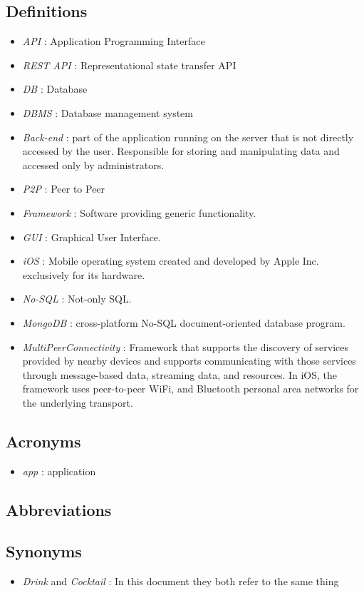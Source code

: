 \documentclass[paper=a4, fontsize=12pt]{scrartcl}
\numberwithin{equation}{section}		%
\numberwithin{figure}{section}			%
\numberwithin{table}{section}				%
\begin{document}
\subsection{Definitions}
\begin{itemize}
    \item \textit{API} : Application Programming Interface
    \item \textit{REST API} : Representational state transfer API
    \item \textit{DB} : Database
    \item \textit{DBMS} : Database management system
    \item \textit{Back-end} : part of the application running on the server that is not directly accessed by the user. Responsible for storing and manipulating data and accessed only by administrators. 
    \item \textit{P2P} : Peer to Peer
	\item \textit{Framework} : Software providing generic functionality.
	\item \textit{GUI} : Graphical User Interface.
	\item \textit{iOS} : Mobile operating system created and developed by Apple Inc. exclusively for its hardware.
    \item \textit{No-SQL} : Not-only SQL.
    \item \textit{MongoDB} : cross-platform No-SQL document-oriented database program.
    \item \textit{MultiPeerConnectivity} : Framework that supports the discovery of services provided by nearby devices and supports communicating with those services through message-based data, streaming data, and resources. In iOS, the framework uses peer-to-peer WiFi, and Bluetooth personal area networks for the underlying transport.
    

\end{itemize}

\subsection{Acronyms}
\begin{itemize}
    \item \textit{app} : application
\end{itemize}
\subsection{Abbreviations}
\subsection{Synonyms}
\begin{itemize}
    \item \textit{Drink} and \textit{Cocktail} : In this document they both refer to the same thing
\end{itemize}
\end{document}
